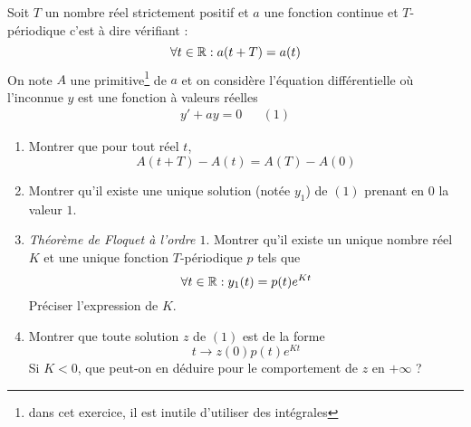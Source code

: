 Soit $T$ un nombre réel strictement positif et $a$ une fonction continue et $T$-périodique c'est à dire vérifiant :
\begin{displaymath}
 \forall t\in \mathbb{R} : a(t+T)=a(t)
\end{displaymath}
On note $A$ une primitive\footnote{dans cet exercice, il est inutile d'utiliser des intégrales} de $a$ et on considère l'équation différentielle où l'inconnue $y$ est une fonction à valeurs réelles
\begin{align*}
  y'+ay = 0 & & (1)
\end{align*}
\begin{enumerate}
 \item Montrer que pour tout réel $t$,
\begin{displaymath}
 A(t+T) - A(t) = A(T) - A(0)
\end{displaymath}
\item Montrer qu'il existe une unique solution (notée $y_1$) de $(1)$ prenant en $0$ la valeur $1$.
\item \emph{Théorème de Floquet à l'ordre $1$}.\newline
 Montrer qu'il existe un unique nombre réel $K$ et une unique fonction $T$-périodique $p$ tels que
\begin{displaymath}
 \forall t \in \mathbb{R} : y_1(t) = p(t)e^{Kt}
\end{displaymath}
Préciser l'expression de $K$.
\item Montrer que toute solution $z$ de $(1)$ est de la forme
\begin{displaymath}
 t\rightarrow z(0)p(t)e^{Kt}
\end{displaymath}
Si $K<0$, que peut-on en déduire pour le comportement de $z$ en $+\infty$ ?
\end{enumerate}

